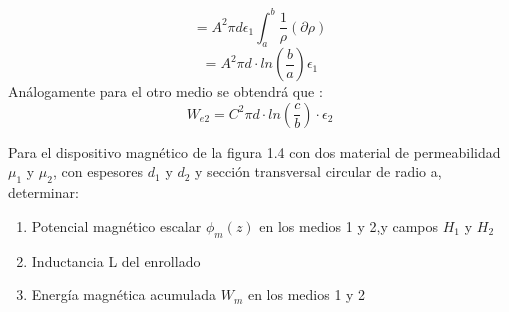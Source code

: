 \documentclass[
  11pt,
  letterpaper,
   addpoints,
   answers
  ]{exam}
\begin{document}
\begin{questions}
\begin{solution}
\begin{enumerate}
\begin{equation}
        \end{equation}
        \begin{equation}
            = A^{2} \pi d\epsilon_{1} \int_{a}^{b} \frac{1}{\rho} (\partial\rho)
        \end{equation}
        \begin{equation}
            = A^{2}\pi  d \cdot ln\left(\frac{b}{a}\right) \epsilon_{1}
        \end{equation}
        Análogamente para el otro medio se obtendrá que :
        \begin{equation}
            W_{e2}= C^{2} \pi d \cdot ln\left(\frac{c}{b}\right) \cdot \epsilon_{2}
        \end{equation}
    \end{enumerate}
\end{solution}
\question  Para el dispositivo magnético de la figura 1.4 con dos material de permeabilidad $\mu_{1}$ y $\mu_{2}$, con espesores $d_{1}$ y $d_{2}$ y sección transversal circular de radio a, determinar: 
\begin{enumerate} 
    \item Potencial magnético escalar $\phi_{m}(z)$ en los medios 1 y 2,y campos $H_{1}$ y $H_{2}$ 
    \item Inductancia L del enrollado
    \item Energía magnética acumulada $W_{m}$ en los medios 1 y 2 
\end{enumerate}
\begin{center}
\end{center}
\end{questions}
\end{document}
